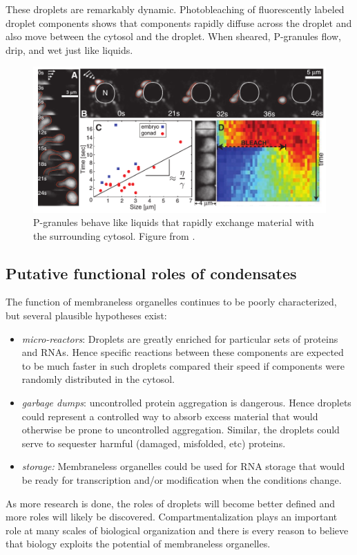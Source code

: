 These droplets are remarkably dynamic.
Photobleaching of fluorescently labeled droplet components shows that components rapidly diffuse across the droplet and also move between the cytosol and the droplet.
When sheared, P-granules flow, drip, and wet just like liquids.


\begin{figure}[tb]
	\centering
	\includegraphics[width=\textwidth]{figures/Brangwynne_Pgranules_liquid.png}
	\caption{P-granules behave like liquids that rapidly exchange material with the surrounding cytosol. Figure from \citep{brangwynne_germline_2009}.}
	\label{fig:pgranules_liquid}
\end{figure}

\subsection*{Putative functional roles of condensates}
The function of membraneless organelles continues to be poorly characterized, but several plausible hypotheses exist:
\begin{itemize}
	\item {\it micro-reactors}: Droplets are greatly enriched for particular sets of proteins and RNAs. Hence specific reactions between these components are expected to be much faster in such droplets compared their speed if components were randomly distributed in the cytosol.
	\item {\it garbage dumps}: uncontrolled protein aggregation is dangerous. Hence droplets could represent a controlled way to absorb excess material that would otherwise be prone to uncontrolled aggregation. Similar, the droplets could serve to sequester harmful (damaged, misfolded, etc) proteins.
	\item {\it storage:} Membraneless organelles could be used for RNA storage that would be ready for transcription and/or modification when the conditions change.
\end{itemize}
As more research is done, the roles of droplets will become better defined and more roles will likely be discovered.
Compartmentalization plays an important role at many scales of biological organization and there is every reason to believe that biology exploits the potential of membraneless organelles.